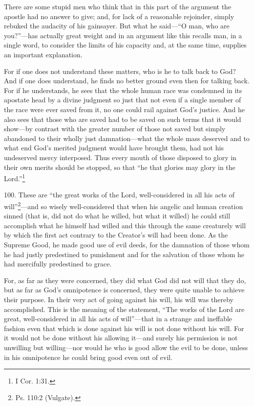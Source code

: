 There are some stupid men who think that in this part of the argument the apostle had no answer to give; and, for lack of a reasonable rejoinder, simply rebuked the audacity of his gainsayer. But what he said—``O man, who are you?''—has actually great weight and in an argument like this recalls man, in a single word, to consider the limits of his capacity and, at the same time, supplies an important explanation.

For if one does not understand these matters, who is he to talk back to God? And if one does understand, he finds no better ground even then for talking back. For if he understands, he sees that the whole human race was condemned in its apostate head by a divine judgment so just that not even if a single member of the race were ever saved from it, no one could rail against God's justice. And he also sees that those who are saved had to be saved on such terms that it would show—by contrast with the greater number of those not saved but simply abandoned to their wholly just damnation—what the whole mass deserved and to what end God's merited judgment would have brought them, had not his undeserved mercy interposed. Thus every mouth of those disposed to glory in their own merits should be stopped, so that ``he that glories may glory in the Lord.''\footnote{I Cor. 1:31.}


100. These are ``the great works of the Lord, well-considered in all his acts of will''\footnote{Ps. 110:2 (Vulgate).}—and so wisely well-considered that when his angelic and human creation sinned (that is, did not do what he willed, but what it willed) he could still accomplish what he himself had willed and this through the same creaturely will by which the first act contrary to the Creator's will had been done. As the Supreme Good, he made good use of evil deeds, for the damnation of those whom he had justly predestined to punishment and for the salvation of those whom he had mercifully predestined to grace.

For, as far as they were concerned, they did what God did not will that they do, but as far as God's omnipotence is concerned, they were quite unable to achieve their purpose. In their very act of going against his will, his will was thereby accomplished. This is the meaning of the statement, ``The works of the Lord are great, well-considered in all his acts of will''—that in a strange and ineffable fashion even that which is done against his will is not done without his will. For it would not be done without his allowing it—and surely his permission is not unwilling but willing—nor would he who is good allow the evil to be done, unless in his omnipotence he could bring good even out of evil.

